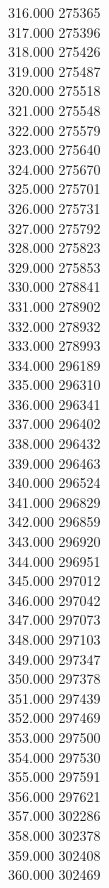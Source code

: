 { 316.000	275365 \\
 317.000	275396 \\
 318.000	275426 \\
 319.000	275487 \\
 320.000	275518 \\
 321.000	275548 \\
 322.000	275579 \\
 323.000	275640 \\
 324.000	275670 \\
 325.000	275701 \\
 326.000	275731 \\
 327.000	275792 \\
 328.000	275823 \\
 329.000	275853 \\
 330.000	278841 \\
 331.000	278902 \\
 332.000	278932 \\
 333.000	278993 \\
 334.000	296189 \\
 335.000	296310 \\
 336.000	296341 \\
 337.000	296402 \\
 338.000	296432 \\
 339.000	296463 \\
 340.000	296524 \\
 341.000	296829 \\
 342.000	296859 \\
 343.000	296920 \\
 344.000	296951 \\
 345.000	297012 \\
 346.000	297042 \\
 347.000	297073 \\
 348.000	297103 \\
 349.000	297347 \\
 350.000	297378 \\
 351.000	297439 \\
 352.000	297469 \\
 353.000	297500 \\
 354.000	297530 \\
 355.000	297591 \\
 356.000	297621 \\
 357.000	302286 \\
 358.000	302378 \\
 359.000	302408 \\
 360.000	302469 \\
}
